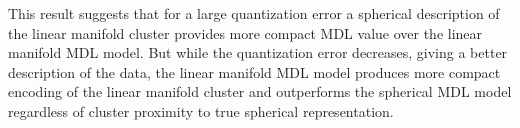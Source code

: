 This result suggests that for a large quantization error a spherical description
of the linear manifold cluster provides more compact MDL value over
the linear manifold MDL model. But while the quantization error decreases,
giving a better description of the data, the linear manifold MDL model produces
more compact encoding of the linear manifold cluster and outperforms the spherical
MDL model regardless of cluster proximity to true spherical representation.
